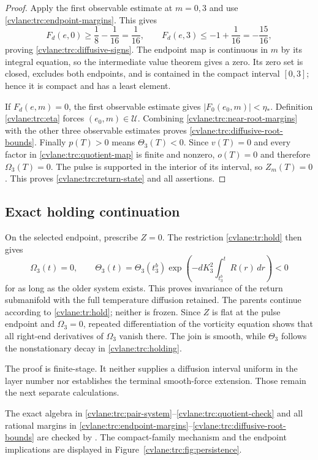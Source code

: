 \begin{proof}
Apply the first observable estimate at $m=0,3$ and use
\eqref{cvlane:trc:endpoint-margins}.  This gives
\[
 F_d(e,0)\geq\frac18-\frac1{16}=\frac1{16},\qquad
 F_d(e,3)\leq-1+\frac1{16}=-\frac{15}{16},
\]
proving \eqref{cvlane:trc:diffusive-signs}.  The endpoint map is continuous in
$m$ by its integral equation, so the intermediate value theorem gives a
zero.  Its zero set is closed, excludes both endpoints, and is contained
in the compact interval $[0,3]$; hence it is compact and has a least
element.

If $F_d(e,m)=0$, the first observable estimate gives
$|F_0(e_0,m)|<\eta_*$.  Definition \eqref{cvlane:trc:eta} forces
$(e_0,m)\in\mathcal U$.  Combining
\eqref{cvlane:trc:near-root-margins} with the other three observable estimates
proves \eqref{cvlane:trc:diffusive-root-bounds}.  Finally $p(T)>0$ means
$\Theta_3(T)<0$.  Since $v(T)=0$ and every factor in
\eqref{cvlane:trc:quotient-map} is finite and nonzero, $o(T)=0$ and therefore
$\Omega_3(T)=0$.  The pulse is supported in the interior of its interval,
so $Z_m(T)=0$.  This proves \eqref{cvlane:trc:return-state} and all assertions.
\end{proof}

\subsection{Exact holding continuation}

On the selected endpoint, prescribe $Z=0$.  The restriction
\eqref{cvlane:tr:hold} then gives
\begin{equation}\label{cvlane:trc:holding}
 \Omega_3(t)=0,\qquad
 \Theta_3(t)=\Theta_3(t_3^b)
 \exp\!\left(-dK_3^2\int_{t_3^b}^{t}R(r)\,dr\right)<0
\end{equation}
for as long as the older system exists.  This proves invariance of the
return submanifold with the full temperature diffusion retained.  The
parents continue according to \eqref{cvlane:tr:hold}; neither is frozen.  Since
$Z$ is flat at the pulse endpoint and $\Omega_3=0$, repeated
differentiation of the vorticity equation shows that all right-end
derivatives of $\Omega_3$ vanish there.  The join is smooth, while
$\Theta_3$ follows the nonstationary decay in \eqref{cvlane:trc:holding}.

The proof is finite-stage.  It neither supplies a diffusion interval
uniform in the layer number nor establishes the terminal smooth-force
extension.  Those remain the next separate calculations.

The exact algebra in \eqref{cvlane:trc:pair-system}--\eqref{cvlane:trc:quotient-check}
and all rational margins in
\eqref{cvlane:trc:endpoint-margins}--\eqref{cvlane:trc:diffusive-root-bounds} are checked
by .  The compact-family
mechanism and the endpoint implications are displayed in
Figure~\ref{cvlane:trc:fig:persistence}.

